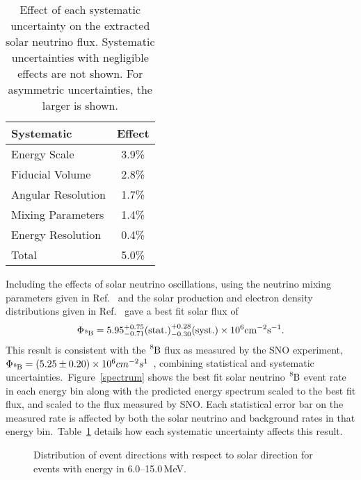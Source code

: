 \begin{table}
\begin{center}
\begin{tabular}{l c}
\hline
\hline
Systematic & Effect \\
\hline
Energy Scale & 3.9\% \\
Fiducial Volume & 2.8\% \\
Angular Resolution & 1.7\% \\
Mixing Parameters & 1.4\% \\
Energy Resolution & 0.4\% \\
\hline
Total & 5.0\%\\
\hline
\hline
\end{tabular}
\caption{Effect of each systematic uncertainty on the extracted solar neutrino
         flux. Systematic uncertainties with negligible effects
         are not shown. For asymmetric uncertainties, the larger is shown.}
\label{table:systematics}
\end{center}
\end{table}

Including the effects of solar neutrino oscillations, using the neutrino mixing
parameters given in Ref.~\cite{pdg2016} and the solar production and electron
density distributions given in Ref.~\cite{bs05op} gave a best fit solar flux
of
\begin{equation*}
    \Phi_{\ce{^{8}B}}= 5.95^{+0.75}_{-0.71}\text{(stat.)}^{+0.28}_{-0.30}\text{(syst.)}\times10^{6}\text{cm}^{-2}\text{s}^{-1}\text{.}
\end{equation*}
This result is consistent with the $\ce{^{8}B}$ flux as measured by the SNO experiment,
$\Phi_{\ce{^{8}B}}=\left(5.25\pm0.20\right)\times10^{6}cm^{-2}s^{1}$~\cite{sno_combined}, combining statistical
and systematic uncertainties.\
Figure~\ref{spectrum} shows the best fit solar neutrino $\ce{^{8}B}$ event rate in each
energy bin along with the predicted energy spectrum scaled to the best fit
flux, and scaled to the flux measured by SNO\@. Each statistical error bar on the
measured rate is affected by both the solar neutrino and background rates in that
energy bin.\
Table~\ref{table:systematics} details how each systematic uncertainty affects this result.\

\begin{figure}[htbp]
    \centering
\caption{Distribution of event directions with respect to solar direction for
    events with energy in \numrange[range-phrase=--]{6.0}{15.0}\,MeV.}
\label{fig:cos_theta_six}
\end{figure}

